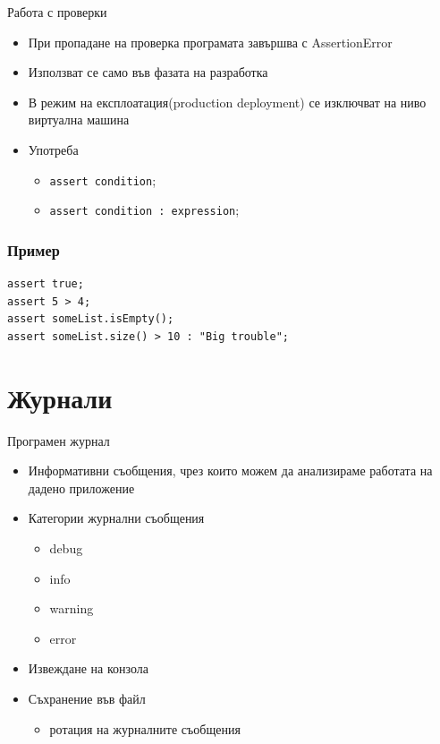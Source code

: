 \documentclass{beamer}
\begin{document}
\begin{frame}{Работа с проверки}
  \transdissolve
  \begin{itemize}
  \item При пропадане на проверка програмата завършва с AssertionError \pause
  \item Използват се само във фазата на разработка \pause
  \item В режим на експлоатация(production deployment) се изключват на
    ниво виртуална машина \pause
  \item Употреба
    \begin{itemize}
      \item \lstinline$assert condition$;
      \item \lstinline$assert condition : expression$;
    \end{itemize}
  \end{itemize}
\end{frame}

\begin{frame}[fragile]
  \frametitle{Пример}
  \transdissolve
\begin{lstlisting}
assert true;
assert 5 > 4;
assert someList.isEmpty();
assert someList.size() > 10 : "Big trouble";
\end{lstlisting}
\end{frame}


\section{Журнали}

\begin{frame}{Програмен журнал}
\transdissolve
\begin{itemize}
\item Информативни съобщения, чрез които можем да анализираме работата
  на дадено приложение \pause
\item Категории журнални съобщения
\begin{itemize}
  \item debug
  \item info
  \item warning
  \item error \pause
\end{itemize}
\item Извеждане на конзола \pause
\item Съхранение във файл \pause
\begin{itemize}
  \item ротация на журналните съобщения
\end{itemize}
\end{itemize}
\end{frame}
\end{document}
